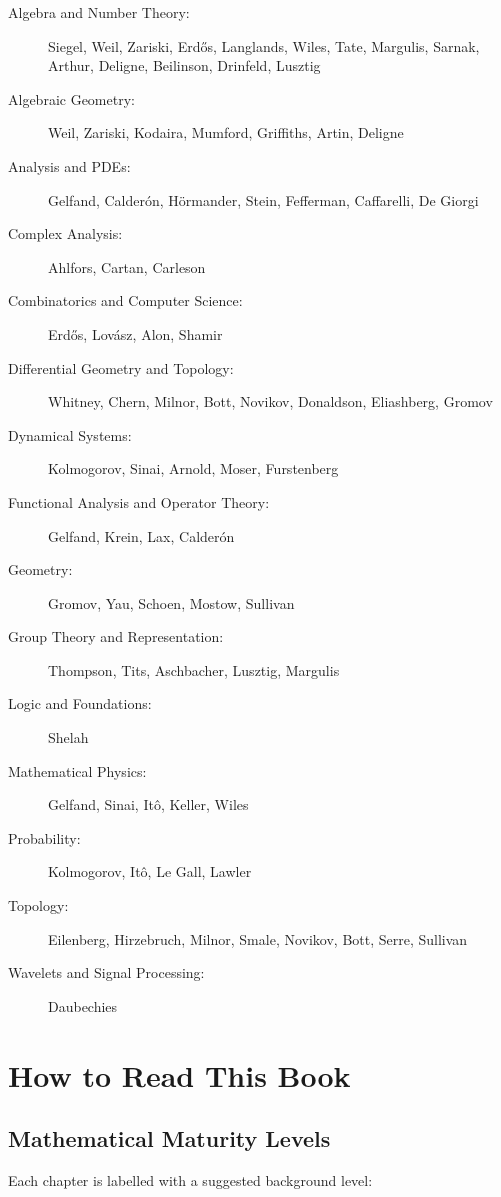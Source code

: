 \begin{description}
    \item[Algebra and Number Theory:] Siegel, Weil, Zariski, Erd\H{o}s, Langlands, Wiles, Tate, Margulis, Sarnak, Arthur, Deligne, Beilinson, Drinfeld, Lusztig
    \item[Algebraic Geometry:] Weil, Zariski, Kodaira, Mumford, Griffiths, Artin, Deligne
    \item[Analysis and PDEs:] Gelfand, Calder\'on, H\"ormander, Stein, Fefferman, Caffarelli, De Giorgi
    \item[Complex Analysis:] Ahlfors, Cartan, Carleson
    \item[Combinatorics and Computer Science:] Erd\H{o}s, Lov\'asz, Alon, Shamir
    \item[Differential Geometry and Topology:] Whitney, Chern, Milnor, Bott, Novikov, Donaldson, Eliashberg, Gromov
    \item[Dynamical Systems:] Kolmogorov, Sinai, Arnold, Moser, Furstenberg
    \item[Functional Analysis and Operator Theory:] Gelfand, Krein, Lax, Calder\'on
    \item[Geometry:] Gromov, Yau, Schoen, Mostow, Sullivan
    \item[Group Theory and Representation:] Thompson, Tits, Aschbacher, Lusztig, Margulis
    \item[Logic and Foundations:] Shelah
    \item[Mathematical Physics:] Gelfand, Sinai, It\^o, Keller, Wiles
    \item[Probability:] Kolmogorov, It\^o, Le Gall, Lawler
    \item[Topology:] Eilenberg, Hirzebruch, Milnor, Smale, Novikov, Bott, Serre, Sullivan
    \item[Wavelets and Signal Processing:] Daubechies
\end{description}

\section{How to Read This Book}

\subsection{Mathematical Maturity Levels}

Each chapter is labelled with a suggested background level:

